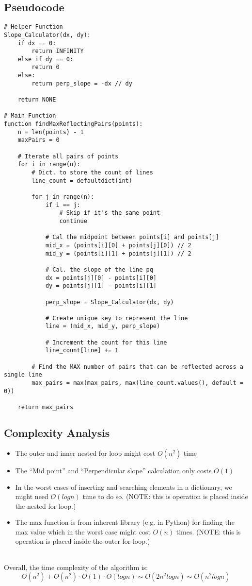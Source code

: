 \documentclass{article}
\begin{document}
\subsection*{Pseudocode}
\begin{verbatim}
# Helper Function
Slope_Calculator(dx, dy):
    if dx == 0:
        return INFINITY
    else if dy == 0:
        return 0
    else:
        return perp_slope = -dx // dy

    return NONE

# Main Function
function findMaxReflectingPairs(points):
    n = len(points) - 1
    maxPairs = 0

    # Iterate all pairs of points
    for i in range(n):
        # Dict. to store the count of lines
        line_count = defaultdict(int)

        for j in range(n):
            if i == j:
                # Skip if it's the same point
                continue 

            # Cal the midpoint between points[i] and points[j]
            mid_x = (points[i][0] + points[j][0]) // 2
            mid_y = (points[i][1] + points[j][1]) // 2

            # Cal. the slope of the line pq
            dx = points[j][0] - points[i][0]
            dy = points[j][1] - points[i][1]

            perp_slope = Slope_Calculator(dx, dy)

            # Create unique key to represent the line
            line = (mid_x, mid_y, perp_slope)

            # Increment the count for this line
            line_count[line] += 1

        # Find the MAX number of pairs that can be reflected across a single line
        max_pairs = max(max_pairs, max(line_count.values(), default = 0))

    return max_pairs

\end{verbatim}

\subsection*{Complexity Analysis}
\begin{itemize}
    \item The outer and inner nested for loop might cost $O(n^2)$ time 
    \item The ``Mid point'' and ``Perpendicular slope'' calculation only costs $O(1)$ 
    \item In the worst cases of inserting and searching elements in a dictionary, we might need $O(logn)$ time to do so. (NOTE: this is operation is placed inside the nested for loop.)
    \item The max function is from inherent library (e.g. in Python) for finding the max value which in the worst case might cost $O(n)$ times. (NOTE: this is operation is placed inside the outer for loop.)
\end{itemize}
\\
Overall, the time complexity of the algorithm is:
\[ O(n^2) + O(n^2) \cdot O(1) \cdot O(logn) \sim O(2n^2logn) \sim O(n^2logn) \]
\end{document}
